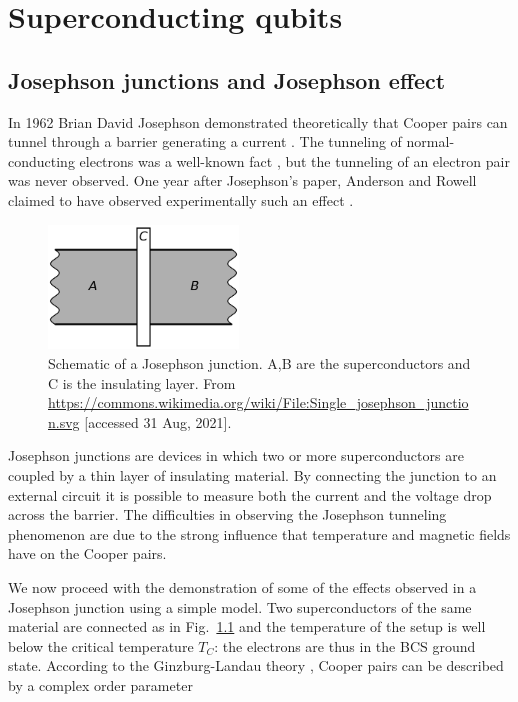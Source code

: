\documentclass[../main/main.tex]{subfiles}
\begin{document}
\chapter{Superconducting qubits}

\section{Josephson junctions and Josephson effect} \label{sect:josephson_junction_effect}
In 1962 Brian David Josephson demonstrated theoretically that Cooper pairs can tunnel through a barrier generating a current \cite{JOSEPHSON1962251}. The tunneling of normal-conducting electrons was a well-known fact \cite{PhysRevLett.8.316,shapiro_5392409}, but the tunneling of an electron pair was never observed. One year after Josephson's paper, Anderson and Rowell claimed to have observed experimentally such an effect \cite{PhysRevLett.10.230}. \par
\begin{figure}[ht]
    \vspace{0.2cm}
    \centering
    \includegraphics[width=0.45\textwidth]{../images/josephson_junction.png}
    \vspace{-0.2cm}
    \caption{Schematic of a Josephson junction. A,B are the superconductors and C is the insulating layer. From \url{https://commons.wikimedia.org/wiki/File:Single_josephson_junction.svg} [accessed 31 Aug, 2021].}
    \label{fig:josephson_junction}
\end{figure}
\vspace{0.4cm}
Josephson junctions are devices in which two or more superconductors are coupled by a thin layer of insulating material. By connecting the junction to an external circuit it is possible to measure both the current and the voltage drop across the barrier. The difficulties in observing the Josephson tunneling phenomenon are due to the strong influence that temperature and magnetic fields have on the Cooper pairs. \par
We now proceed with the demonstration of some of the effects observed in a Josephson junction using a simple model. Two superconductors of the same material are connected as in Fig.~\ref{fig:josephson_junction} and the temperature of the setup is well below the critical temperature $T_C$: the electrons are thus in the BCS ground state. According to the Ginzburg-Landau theory \cite{Landau:486430}, Cooper pairs can be described by a complex order parameter
\end{document}
